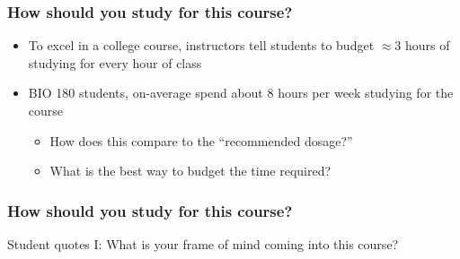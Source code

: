\begin{noheadline}
\begin{frame}
    \frametitle{How should you study for this course?}
    \begin{itemize}[<+->]
        \item To excel in a college course, instructors tell students to budget
            $\approx$3 hours of studying for every hour of class
        \item BIO 180 students, on-average spend about 8 hours per week studying
            for the course
            \begin{itemize}
                \item How does this compare to the ``recommended dosage?''
                \item What is the best way to budget the time required?
            \end{itemize}
    \end{itemize}
\end{frame}
\end{noheadline}

\begin{noheadline}
\begin{frame}
    \frametitle{How should you study for this course?}
    Student quotes I: What is your frame of mind coming into this course? \\

\end{frame}
\end{noheadline}

